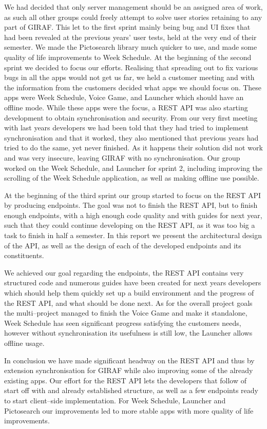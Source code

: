\bigskip
We had decided that only server management should be an assigned area of work, as such all other groups could freely attempt to solve user stories retaining to any part of GIRAF.
This let to the first sprint mainly being bug and UI fixes that had been revealed at the previous years' user tests, held at the very end of their semester.
We made the Pictosearch library much quicker to use, and made some quality of life improvements to Week Schedule.
At the beginning of the second sprint we decided to focus our efforts.
Realising that spreading out to fix various bugs in all the apps would not get us far, we held a customer meeting and with the information from the customers decided what apps we should focus on.
These apps were Week Schedule, Voice Game, and Launcher which should have an offline mode.
While these apps were the focus, a REST API was also starting development to obtain synchronisation and security.
From our very first meeting with last years developers we had been told that they had tried to implement synchronisation and that it worked, they also mentioned that previous years had tried to do the same, yet never finished.
As it happens their solution did not work and was very insecure, leaving GIRAF with no synchronisation.
Our group worked on the Week Schedule, and Launcher for sprint 2, including improving the scrolling of the Week Schedule application, as well as making offline use possible.

\bigskip
At the beginning of the third sprint our group started to focus on the REST API by producing endpoints.
The goal was not to finish the REST API, but to finish enough endpoints, with a high enough code quality and with guides for next year, such that they could continue developing on the REST API, as it was too big a task to finish in half a semester.
In this report we present the architectural design of the API, as well as the design of each of the developed endpoints and its constituents.

We achieved our goal regarding the endpoints, the REST API contains very structured code and numerous guides have been created for next years developers which should help them quickly set up a build environment and the progress of the REST API, and what should be done next.
As for the overall project goals the multi--project managed to finish the Voice Game and make it standalone, Week Schedule has seen significant progress satisfying the customers needs, however without synchronisation its usefulness is still low, the Launcher allows offline usage.

In conclusion we have made significant headway on the REST API and thus by extension synchronisation for GIRAF while also improving some of the already existing apps.
Our effort for the REST API lets the developers that follow of start off with and already established structure, as well as a few endpoints ready to start client--side implementation.
For Week Schedule, Launcher and Pictosearch our improvements led to more stable apps with more quality of life improvements.
